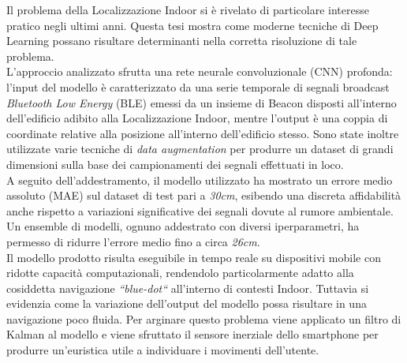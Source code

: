 \documentclass{standalone}
\begin{document}
Il problema della Localizzazione Indoor si è rivelato di particolare interesse
pratico negli ultimi anni. Questa tesi mostra come moderne tecniche di Deep
Learning possano risultare determinanti nella corretta risoluzione di tale
problema.
\\
L'approccio analizzato sfrutta una rete neurale convoluzionale (CNN) profonda:
l'input del modello è caratterizzato da una serie temporale di segnali
broadcast \emph{Bluetooth Low Energy} (BLE) emessi da un insieme di Beacon
disposti all'interno dell'edificio adibito alla Localizzazione Indoor, mentre
l'output è una coppia di coordinate relative alla posizione all'interno
dell'edificio stesso. Sono state inoltre utilizzate varie tecniche di
\emph{data augmentation} per produrre un dataset di grandi dimensioni sulla
base dei campionamenti dei segnali effettuati in loco.
\\
A seguito dell'addestramento, il modello utilizzato ha mostrato un errore medio
assoluto (MAE) sul dataset di test pari a \emph{30cm}, esibendo una discreta
affidabilità anche rispetto a variazioni significative dei segnali dovute al
rumore ambientale. Un ensemble di modelli, ognuno addestrato con diversi
iperparametri, ha permesso di ridurre l'errore medio fino a circa \emph{26cm}.
\\
Il modello prodotto risulta eseguibile in tempo reale su dispositivi
mobile con ridotte capacità computazionali, rendendolo particolarmente adatto
alla 
cosiddetta navigazione \emph{``blue-dot``} all'interno di contesti Indoor.
Tuttavia si evidenzia come la variazione dell'output del modello possa
risultare in una navigazione poco fluida. Per arginare questo problema viene
applicato un filtro di Kalman al modello e viene sfruttato il sensore inerziale
dello smartphone per produrre un'euristica utile a individuare i movimenti
dell'utente.  
\end{document}
